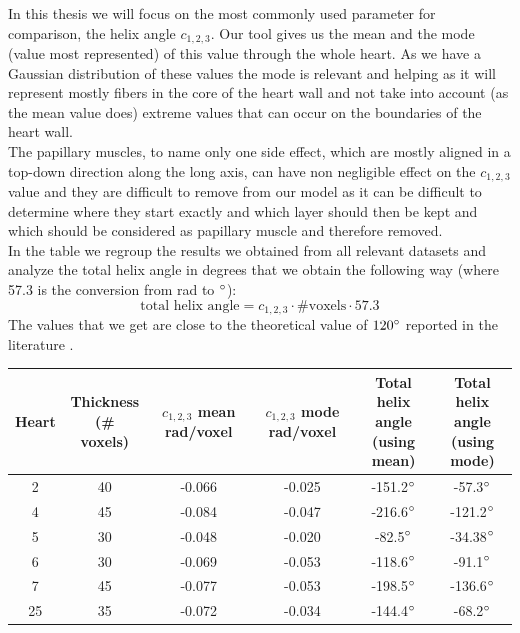In this thesis we will focus on the most commonly used parameter for comparison, the helix angle $c_{1,2,3}$. Our tool gives us the mean and the mode (value most represented) of this value through the whole heart. As we have a Gaussian distribution of these values the mode is relevant and helping as it will represent mostly fibers in the core of the heart wall and not take into account (as the mean value does) extreme values that can occur on the boundaries of the heart wall.\\
The papillary muscles, to name only one side effect, which are mostly aligned in a top-down direction along the long axis, can have non negligible effect on the $c_{1,2,3}$ value and they are difficult to remove from our model as it can be difficult to determine where they start exactly and which layer should then be kept and which should be considered as papillary muscle and therefore removed.\\
In the table we regroup the results we obtained from all relevant datasets and analyze the total helix angle in degrees that we obtain the following way (where 57.3 is the conversion from rad to $^{\circ}$):
\begin{equation}
    \text{total helix angle} = c_{1,2,3}\cdot \text{\#voxels}\cdot 57.3
\end{equation}
The values that we get are close to the theoretical value of $120^{\circ}$ reported in the literature \cite{piuzephd}.

\begin{center}
    \begin{tabular}{|c | c | c | c| c| c|} 
         \hline
         Heart & \shortstack{Thickness \\ (\# voxels)} & \shortstack{$c_{1,2,3}$ mean \\ rad/voxel} & \shortstack{$c_{1,2,3}$ mode \\ rad/voxel} & \shortstack{Total helix angle \\ (using mean)} & \shortstack{Total helix angle \\ (using mode)}\\
         \hline
         2 & 40 & -0.066 & -0.025 & -151.2$^{\circ}$ & -57.3$^{\circ}$ \\ 
         \hline
         4 & 45 & -0.084 & -0.047 & -216.6$^{\circ}$ & -121.2$^{\circ}$ \\
         \hline
         5 & 30 & -0.048 & -0.020 & -82.5$^{\circ}$ & -34.38$^{\circ}$ \\
         \hline
         6 & 30 & -0.069 & -0.053 & -118.6$^{\circ}$ & -91.1$^{\circ}$ \\
         \hline
         7 & 45 & -0.077 & -0.053 & -198.5$^{\circ}$ & -136.6$^{\circ}$ \\ 
         \hline
         25 & 35 & -0.072 & -0.034 & -144.4$^{\circ}$ & -68.2$^{\circ}$ \\
         \hline
    \end{tabular}
\end{center}


